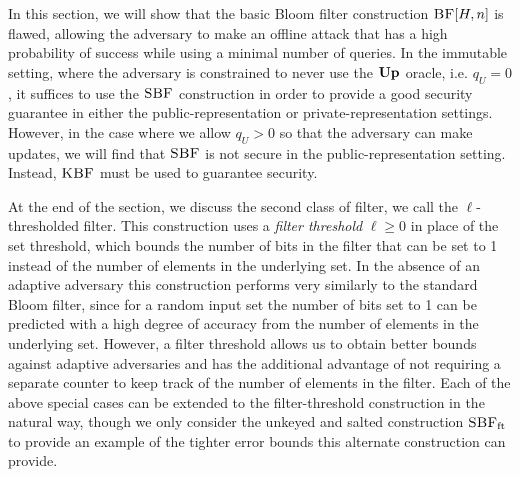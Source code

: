 In this section, we will show that the basic Bloom filter construction
$\textnormal{\textsc{BF}}[H,n]$ is flawed, allowing the adversary to make an offline attack that
has a high probability of success while using a minimal number of queries. In
the immutable setting, where the adversary is constrained to never use the
$\textup{\textbf{Up}}\hspace{0.5pt}$ oracle, i.e. $q_U = 0$, it suffices to use the $\textnormal{\textsc{SBF}}$ construction in
order to provide a good security guarantee in either the public-representation
or private-representation settings. However, in the case where we allow
$q_U > 0$ so that the adversary can make updates, we will find that $\textnormal{\textsc{SBF}}$ is
not secure in the public-representation setting. Instead, $\textnormal{\textsc{KBF}}$ must be used to
guarantee security.

At the end of the section, we discuss the second class of filter, we call the
$\ell$-thresholded filter. This construction uses a \emph{filter threshold}
$\ell\geq0$ in place of the set threshold, which bounds the number of bits in
the filter that can be set to 1 instead of the number of elements in the
underlying set. In the absence of an adaptive adversary this construction
performs very similarly to the standard Bloom filter, since for a random input
set the number of bits set to 1 can be predicted with a high degree of accuracy
from the number of elements in the underlying set. However, a filter threshold
allows us to obtain better bounds against adaptive adversaries and has the
additional advantage of not requiring a separate counter to keep track of the
number of elements in the filter. Each of the above special cases can be
extended to the filter-threshold construction in the natural way, though we only
consider the unkeyed and salted construction $\textnormal{\textsc{SBF}}_\mathrm{ft}$ to provide an example
of the tighter error bounds this alternate construction can provide.


